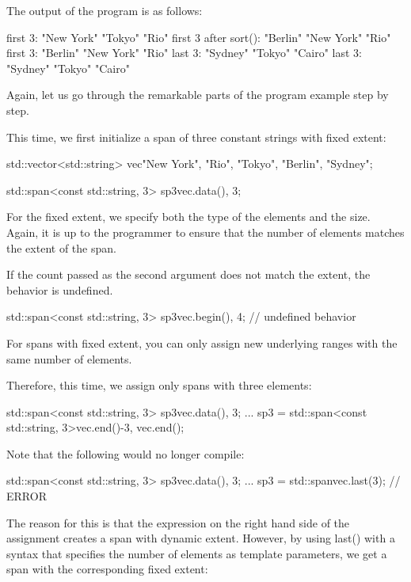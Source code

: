 The output of the program is as follows:

\begin{shell}
first 3:              "New York" "Tokyo" "Rio"
first 3 after sort(): "Berlin" "New York" "Rio"
first 3: "Berlin" "New York" "Rio"
last 3: "Sydney" "Tokyo" "Cairo"
last 3: "Sydney" "Tokyo" "Cairo"
\end{shell}

Again, let us go through the remarkable parts of the program example step by step.


This time, we first initialize a span of three constant strings with fixed extent:

\begin{cpp}
std::vector<std::string> vec{"New York", "Rio", "Tokyo", "Berlin", "Sydney"};

std::span<const std::string, 3> sp3{vec.data(), 3};
\end{cpp}

For the fixed extent, we specify both the type of the elements and the size.
Again, it is up to the programmer to ensure that the number of elements matches the extent of the span.

If the count passed as the second argument does not match the extent, the behavior is undefined.

\begin{cpp}
std::span<const std::string, 3> sp3{vec.begin(), 4}; // undefined behavior
\end{cpp}


For spans with fixed extent, you can only assign new underlying ranges with the same number of elements.

Therefore, this time, we assign only spans with three elements:

\begin{cpp}
std::span<const std::string, 3> sp3{vec.data(), 3};
...
sp3 = std::span<const std::string, 3>{vec.end()-3, vec.end()};
\end{cpp}

Note that the following would no longer compile:

\begin{cpp}
std::span<const std::string, 3> sp3{vec.data(), 3};
...
sp3 = std::span{vec}.last(3); // ERROR
\end{cpp}

The reason for this is that the expression on the right hand side of the assignment creates a span with dynamic extent. However, by using last() with a syntax that specifies the number of elements as template parameters, we get a span with the corresponding fixed extent:

